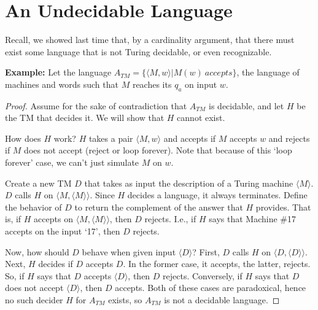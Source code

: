 


\section*{An Undecidable Language}

Recall, we showed last time that, by a cardinality argument, that there must exist some language that is not Turing decidable, or even recognizable.

\textbf{Example:}  Let the language $A_{TM} = \{ \langle M,w\rangle | M(w) \ accepts  \}$, the language of machines and words such that $M$ reaches its $q_a$ on input $w$.


\begin{proof}
	Assume for the sake of contradiction that $A_{TM}$ is decidable, and let $H$ be the TM that decides it.  We will show that $H$ cannot exist.
	
	How does $H$ work?  $H$ takes a pair $\langle M,w\rangle$ and accepts if $M$ accepts $w$ and rejects if $M$ does not accept (reject or loop forever).  Note that because of this `loop forever' case, we can't just simulate $M$ on $w$.
	
	Create a new TM $D$ that takes as input the description of a Turing machine $\langle M \rangle$.  $D$ calls $H$ on $\langle M,\langle M \rangle \rangle$.  Since $H$ decides a language, it always terminates.  Define the behavior of $D$ to return the complement of the answer that $H$ provides.  That is, if $H$ accepts on $\langle M,\langle M \rangle \rangle$, then $D$ rejects.  I.e., if $H$ says that Machine \#17 accepts on the input `17', then $D$ rejects.
	
	Now, how should $D$ behave when given input $\langle D\rangle$?  First, $D$ calls $H$ on $\langle D,\langle D \rangle \rangle$.  Next, $H$ decides if $D$ accepts $D$. In the former case, it accepts, the latter, rejects.  So, if $H$ says that $D$ accepts $\langle D \rangle$, then $D$ rejects.  Conversely, if $H$ says that $D$ does not accept $\langle D \rangle$, then $D$ accepts.  Both of these cases are paradoxical, hence no such decider $H$ for $A_{TM}$ exists, so $A_{TM}$ is not a decidable language.
\end{proof}

